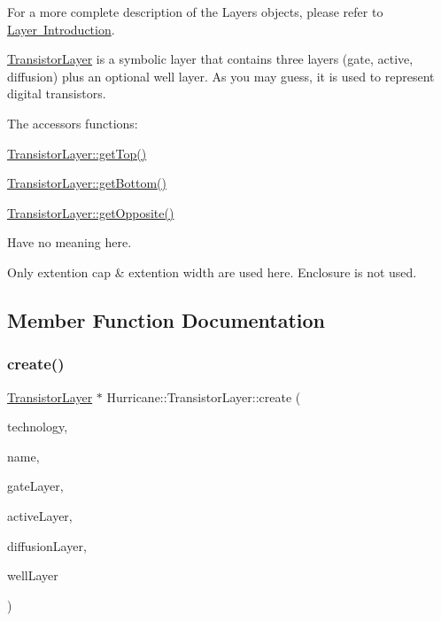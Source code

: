 For a more complete description of the Layers objects, please refer to \mbox{\hyperlink{classHurricane_1_1Layer_secLayerIntro}{Layer Introduction}}.

\mbox{\hyperlink{classHurricane_1_1TransistorLayer}{Transistor\+Layer}} is a symbolic layer that contains three layers (gate, active, diffusion) plus an optional well layer. As you may guess, it is used to represent digital transistors.

The accessors functions\+: 
\begin{DoxyItemize}
\item \mbox{\hyperlink{classHurricane_1_1Layer_a5f7c43a29f3dd02a9ebccbcbf91d6727}{Transistor\+Layer\+::get\+Top()}} 
\item \mbox{\hyperlink{classHurricane_1_1Layer_a4dab4552a219d2d900ed0b1245dc6580}{Transistor\+Layer\+::get\+Bottom()}} 
\item \mbox{\hyperlink{classHurricane_1_1Layer_a69e76c09a56260169c4f5c145a35a47f}{Transistor\+Layer\+::get\+Opposite()}} 
\end{DoxyItemize}Have no meaning here.

Only extention cap \& extention width are used here. Enclosure is not used. 

\subsection{Member Function Documentation}
\mbox{\label{classHurricane_1_1TransistorLayer_ac34a9a0c5056f1f483b670a1e929ed93}} 
\subsubsection{\texorpdfstring{create()}{create()}}
{\footnotesize\ttfamily \mbox{\hyperlink{classHurricane_1_1TransistorLayer}{Transistor\+Layer}} $\ast$ Hurricane\+::\+Transistor\+Layer\+::create (\begin{DoxyParamCaption}\item[{\mbox{\hyperlink{classHurricane_1_1Technology}{Technology}} $\ast$}]{technology,  }\item[{const \mbox{\hyperlink{classHurricane_1_1Name}{Name}} \&}]{name,  }\item[{\mbox{\hyperlink{classHurricane_1_1BasicLayer}{Basic\+Layer}} $\ast$}]{gate\+Layer,  }\item[{\mbox{\hyperlink{classHurricane_1_1BasicLayer}{Basic\+Layer}} $\ast$}]{active\+Layer,  }\item[{\mbox{\hyperlink{classHurricane_1_1BasicLayer}{Basic\+Layer}} $\ast$}]{diffusion\+Layer,  }\item[{\mbox{\hyperlink{classHurricane_1_1BasicLayer}{Basic\+Layer}} $\ast$}]{well\+Layer }\end{DoxyParamCaption})\hspace{0.3cm}{\ttfamily [static]}}


